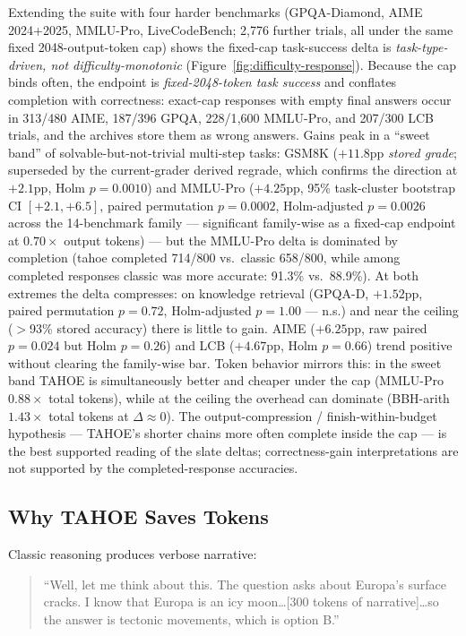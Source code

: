 \documentclass[11pt,a4paper]{article}
\begin{document}
Extending the suite with four harder benchmarks (GPQA-Diamond, AIME
2024+2025, MMLU-Pro, LiveCodeBench; 2{,}776 further trials, all under the
same fixed 2048-output-token cap) shows the fixed-cap task-success delta is
\emph{task-type-driven, not difficulty-monotonic}
(Figure~\ref{fig:difficulty-response}).
Because the cap binds often, the endpoint is \emph{fixed-2048-token task
success} and conflates completion with correctness: exact-cap responses
with empty final answers occur in 313/480 AIME, 187/396 GPQA, 228/1{,}600
MMLU-Pro, and 207/300 LCB trials, and the archives store them as wrong
answers.
Gains peak in a ``sweet band'' of solvable-but-not-trivial multi-step
tasks: GSM8K ($+11.8$pp \emph{stored grade}; superseded by the current-grader
derived regrade, which confirms the direction at $+2.1$pp, Holm $p=0.0010$)
and MMLU-Pro ($+4.25$pp, 95\% task-cluster bootstrap CI $[+2.1, +6.5]$,
paired permutation $p=0.0002$, Holm-adjusted $p=0.0026$ across the
14-benchmark family --- significant family-wise as a fixed-cap endpoint at
$0.70\times$ output tokens) --- but the MMLU-Pro delta is dominated by
completion (tahoe completed 714/800 vs.\ classic 658/800, while among
completed responses classic was more accurate: 91.3\% vs.\ 88.9\%).
At both extremes the delta compresses: on knowledge retrieval (GPQA-D,
$+1.52$pp, paired permutation $p=0.72$, Holm-adjusted $p=1.00$ --- n.s.) and
near the ceiling ($>$93\% stored accuracy) there is little to gain. AIME
($+6.25$pp, raw paired $p=0.024$ but Holm $p=0.26$) and LCB ($+4.67$pp,
Holm $p=0.66$) trend positive without clearing the family-wise bar.
Token behavior mirrors this: in the sweet band TAHOE is simultaneously
better and cheaper under the cap (MMLU-Pro $0.88\times$ total tokens),
while at the ceiling the overhead can dominate (BBH-arith $1.43\times$
total tokens at $\Delta\approx 0$).
The output-compression / finish-within-budget hypothesis --- TAHOE's
shorter chains more often complete inside the cap --- is the best supported
reading of the slate deltas; correctness-gain interpretations are not
supported by the completed-response accuracies.

\subsection{Why TAHOE Saves Tokens}

Classic reasoning produces verbose narrative:
\begin{quote}
\small
``Well, let me think about this. The question asks about Europa's surface cracks. I know that Europa is an icy moon\ldots [300 tokens of narrative]\ldots so the answer is tectonic movements, which is option B.''
\end{quote}
\end{document}
